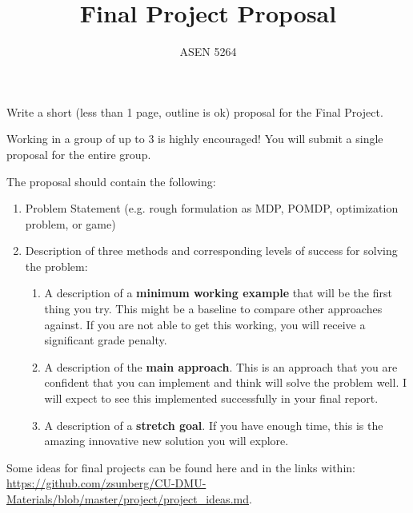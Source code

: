 \documentclass{article}
\title{Final Project Proposal}
\author{ASEN 5264}
\begin{document}
    \maketitle

Write a short (less than 1 page, outline is ok) proposal for the Final Project.

Working in a group of up to 3 is highly encouraged! You will submit a single proposal for the entire group.

The proposal should contain the following:
\begin{enumerate}
    \item Problem Statement (e.g. rough formulation as MDP, POMDP, optimization problem, or game)
    \item Description of three methods and corresponding levels of success for solving the problem:
        \begin{enumerate}
            \item A description of a \textbf{minimum working example} that will be the first thing you try. This might be a baseline to compare other approaches against. If you are not able to get this working, you will receive a significant grade penalty.
            \item A description of the \textbf{main approach}. This is an approach that you are confident that you can implement and think will solve the problem well. I will expect to see this implemented successfully in your final report.
            \item A description of a \textbf{stretch goal}. If you have enough time, this is the amazing innovative new solution you will explore.
        \end{enumerate}
\end{enumerate}

Some ideas for final projects can be found here and in the links within: \url{https://github.com/zsunberg/CU-DMU-Materials/blob/master/project/project_ideas.md}.
\end{document}
